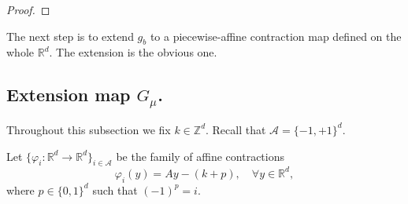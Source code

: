 \documentclass[12pt,reqno,a4paper]{amsart}%
\theoremstyle{definition}
\theoremstyle{remark}
\newcommand{\Rr}{\mathbb{R}}
\newcommand{\Zz}{\mathbb{Z}}
\begin{document}
{{\begin{proof}
\end{proof}

The next step is to extend $g_b$ to a piecewise-affine contraction map defined on the whole $\Rr^d$. The extension is the obvious one. 

\subsection{Extension map $G_\mu$.}



Throughout this subsection we fix $k\in \Zz^d$. Recall that $\mathcal{A}=\{-1,+1\}^d$.

Let $\{\varphi_{{i}}\colon \Rr^d\to\Rr^d\}_{{i\in\mathcal{A}}}$ be the family of affine contractions $$\varphi_{{i}}(y)=Ay-(k+p), \quad{\forall y\in\mathbb{R}^d},$$ where {$p\in\{0,1\}^d$ such that} $(-1)^p={i}$.

}}
\end{document}

